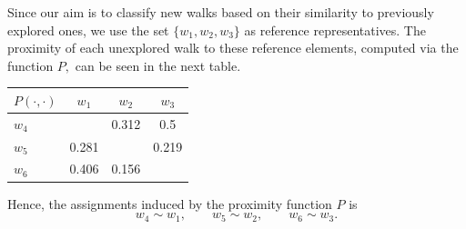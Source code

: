 \documentclass[preprint,12pt]{elsarticle}
\begin{document}
\begin{figure}[h]
\begin{minipage}[t]{0.5\textwidth}
\begin{center}
  \end{center}
\end{minipage}
\end{figure}

Since our aim is to classify new walks based on their similarity to previously explored ones, we use the set $\{w_1,w_2,w_3\}$ as reference representatives. The proximity of each unexplored walk to these reference elements, computed via the function $P,$ can be seen in the next table.
\begin{center}
\begin{tabular}{@{}l|ccc@{}}
\toprule
$P(\cdot, \cdot)$ & $w_1$ & $w_2$ & $w_3$ \\
\midrule
$w_4$ & \color{blue}{0.062} & 0.312 & 0.5 \\
$w_5$ & 0.281 & \color{blue}{0.031} & 0.219 \\
$w_6$ & 0.406 & 0.156 & \color{blue}{0.094} \\
\bottomrule
\end{tabular}
\end{center}

\vspace{3mm}
Hence, the assignments induced by the proximity function $P$ is
$$
w_4 \sim w_1, \qquad w_5 \sim w_2, \qquad w_6 \sim w_3.
$$


\end{document}
